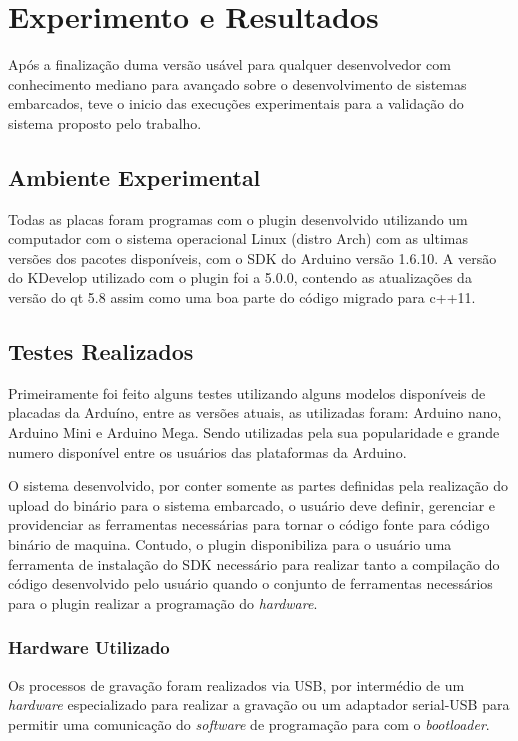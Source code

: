 \chapter{Experimento e Resultados}
Após a finalização duma versão usável para qualquer desenvolvedor com conhecimento mediano para avançado sobre o desenvolvimento de sistemas embarcados, teve o inicio das execuções experimentais para a validação do sistema proposto pelo trabalho.

\section{Ambiente Experimental}

Todas as placas foram programas com o plugin desenvolvido utilizando um computador com o sistema operacional Linux (distro Arch) com as ultimas versões dos pacotes disponíveis, com o SDK do Arduino versão 1.6.10. A versão do KDevelop utilizado com o plugin foi a 5.0.0, contendo as atualizações da versão do qt 5.8 assim como uma boa parte do código migrado para c++11.

\section{Testes Realizados}

Primeiramente foi feito alguns testes utilizando alguns modelos disponíveis de placadas da Arduíno, entre as versões atuais, as utilizadas foram: Arduino nano, Arduino Mini e Arduino Mega. Sendo utilizadas pela sua popularidade e grande numero disponível entre os usuários das plataformas da Arduino.

O sistema desenvolvido, por conter somente as partes definidas pela realização do upload do binário para o sistema embarcado, o usuário deve definir, gerenciar e providenciar as ferramentas necessárias para tornar o código fonte para código binário de maquina. Contudo, o plugin disponibiliza para o usuário uma ferramenta de instalação do SDK necessário para realizar tanto a compilação do código desenvolvido pelo usuário quando o conjunto de ferramentas necessários para o plugin realizar a programação do \textit{hardware}.

\subsection{Hardware Utilizado}

Os processos de gravação foram realizados via USB, por intermédio de um \textit{hardware} especializado para realizar a gravação ou um adaptador serial-USB para permitir uma comunicação do \textit{software} de programação para com o \textit{bootloader}.

